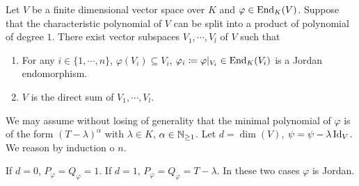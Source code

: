 \begin{theoremenv}
    Let $V$ be a finite dimensional vector space over $K$ and $\varphi \in \operatorname{\mathrm{End}}_{K}(V)$.
    Suppose that the characteristic polynomial of $V$ can be split into a product of polynomial of degree $1$.
    There exist vector subspaces $V_1,\cdots, V_l$ of $V$ such that
    \begin{enumerate}[label = (\arabic*)]
        \item For any $i \in \{1,\cdots,n\}$, $\varphi(V_i) \subseteq V_i$, $\varphi_i \coloneq \varphi|_{V_i} \in \operatorname{\mathrm{End}}_{K}(V_i)$ is a Jordan endomorphism.
        \item $V$ is the direct sum of $V_1,\cdots, V_l$.
    \end{enumerate}
\end{theoremenv}

\begin{proofenv}
    We may assume without losing of generality that the minimal polynomial of $\varphi$ is of the form $(T - \lambda)^\alpha$ with $\lambda \in K$, $\alpha \in \mathbb{N}_{\ge 1}$.
    Let $d = \dim(V)$, $\psi = \psi - \lambda \operatorname{\mathrm{Id}}_{V}$.
    We reason by induction o $n$.

    \quad If $d = 0$, $P_{\varphi} = Q_{\varphi} = 1$.
    If $d = 1$, $P_{\varphi} = Q_{\varphi} = T - \lambda$. In these two cases $\varphi$ is Jordan.


\end{proofenv}
